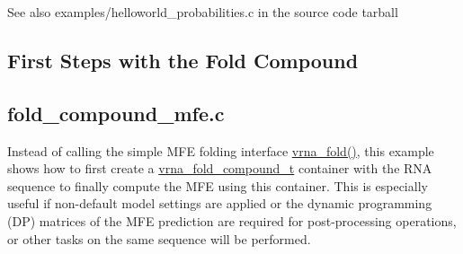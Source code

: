  \begin{DoxySeeAlso}{See also}
{\ttfamily examples/helloworld\+\_\+probabilities.\+c} in the source code tarball
\end{DoxySeeAlso}
\hypertarget{examples_c_ex_c_fc}{}\subsection{First Steps with the Fold Compound}\label{examples_c_ex_c_fc}
\subsection*{fold\+\_\+compound\+\_\+mfe.\+c }

Instead of calling the simple M\+FE folding interface \hyperlink{group__mfe__global_ga29a33b2895f4e67b0480271ff289afdc}{vrna\+\_\+fold()}, this example shows how to first create a \hyperlink{group__fold__compound_ga1b0cef17fd40466cef5968eaeeff6166}{vrna\+\_\+fold\+\_\+compound\+\_\+t} container with the R\+NA sequence to finally compute the M\+FE using this container. This is especially useful if non-\/default model settings are applied or the dynamic programming (DP) matrices of the M\+FE prediction are required for post-\/processing operations, or other tasks on the same sequence will be performed.


